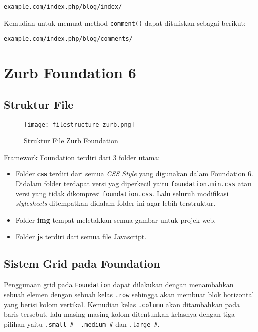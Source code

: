 \begin{lstlisting}[frame=single] 
example.com/index.php/blog/index/
\end{lstlisting}

\noindent Kemudian untuk memuat method \texttt{comment()} dapat dituliskan sebagai berikut:
\begin{lstlisting}[frame=single] 
example.com/index.php/blog/comments/
\end{lstlisting}

\section{Zurb Foundation 6}

\subsection{Struktur File}
\begin{figure} [H]
	\centering  
	\texttt{[image: filestructure\_zurb.png]}  
	\caption{Struktur File Zurb Foundation} 
\end{figure}

Framework Foundation terdiri dari 3 folder utama:
\begin{itemize}
\item Folder \textbf{css} terdiri dari semua \textit{CSS Style} yang digunakan dalam Foundation 6. Didalam folder terdapat versi yag diperkecil yaitu \verb|foundation.min.css| atau versi yang tidak dikompresi \verb|foundation.css|. Lalu seluruh modifikasi \textit{stylesheets} ditempatkan didalam folder ini agar lebih terstruktur.
\item Folder \textbf{img} tempat meletakkan semua gambar untuk projek web.
\item Folder \textbf{js} terdiri dari semua file Javascript.
\end{itemize} \cite{zurbfoundation:17}

\subsection{Sistem Grid pada Foundation}
Penggunaan grid pada \texttt{Foundation} dapat dilakukan dengan menambahkan sebuah elemen dengan sebuah kelas \texttt{.row} sehingga akan membuat blok horizontal yang berisi kolom vertikal. Kemudian kelas \texttt{.column} akan ditambahkan pada baris tersebut, lalu masing-masing kolom ditentunkan kelasnya dengan tiga pilihan yaitu \texttt{.small-\#\, .medium-\#} dan \texttt{.large-\#}. 

